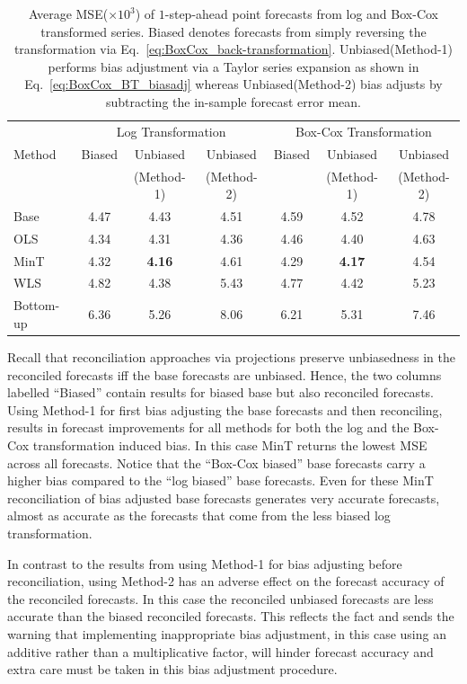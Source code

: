 \documentclass[12pt]{article}
\theoremstyle{definition}
\begin{document}
\begin{table}[!b]
\caption {Average {MSE($\times 10^3$)} of $1$-step-ahead point forecasts from log and Box-Cox transformed series. Biased denotes forecasts from simply reversing the transformation via Eq.~\eqref{eq:BoxCox_back-transformation}. Unbiased(Method-1) performs bias adjustment via a Taylor series expansion as shown in Eq.~\eqref{eq:BoxCox_BT_biasadj} whereas Unbiased(Method-2) bias adjusts by subtracting the in-sample forecast error mean.}
\label{tab:Results_MSE}
\centering
  \begin{tabular}{lcccccc}
    \toprule
    \multicolumn{1}{c}{ } & \multicolumn{3}{c}{Log Transformation} &
    \multicolumn{3}{c}{Box-Cox Transformation}\\
    \cmidrule(lr){2-4} \cmidrule(lr){5-7}
    Method & Biased & Unbiased & Unbiased & Biased & Unbiased & Unbiased \\
    & & (Method-1) & (Method-2) && (Method-1) &(Method-2)\\ \midrule
    Base      & 4.47 & 4.43 & 4.51 & 4.59 & 4.52 & 4.78\\
    OLS       & 4.34 & 4.31 & 4.36 & 4.46 & 4.40 & 4.63\\
    MinT      & 4.32 & \textbf{4.16} & 4.61 & 4.29 & \textbf{4.17} & 4.54\\
    WLS       & 4.82 & 4.38 & 5.43 & 4.77 & 4.42 & 5.23\\
    Bottom-up & 6.36 & 5.26 & 8.06 & 6.21 & 5.31 & 7.46\\
    \bottomrule
  \end{tabular}
\end{table}

Recall that reconciliation approaches via projections preserve unbiasedness in the reconciled forecasts iff the base forecasts are unbiased. Hence, the two columns labelled ``Biased'' contain results for biased base but also reconciled forecasts. Using Method-1 for first bias adjusting the base forecasts and then reconciling, results in forecast improvements for all methods for both the log and the Box-Cox transformation induced bias. In this case MinT returns the lowest MSE across all forecasts. Notice that the ``Box-Cox biased'' base forecasts carry a higher bias compared to the ``log biased'' base forecasts. Even for these MinT reconciliation of bias adjusted base forecasts generates very accurate forecasts, almost as accurate as the forecasts that come from the less biased log transformation.

In contrast to the results from using Method-1 for bias adjusting before reconciliation, using Method-2 has an adverse effect on the forecast accuracy of the reconciled forecasts. In this case the reconciled unbiased forecasts are less accurate than the biased reconciled forecasts. This reflects the fact and sends the warning that implementing inappropriate bias adjustment, in this case using an additive rather than a multiplicative factor, will hinder forecast accuracy and extra care must be taken in this bias adjustment procedure.
\end{document}
